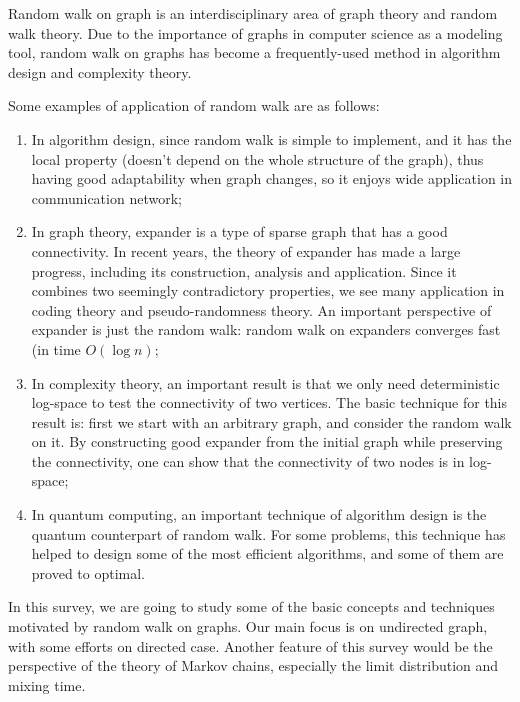 Random walk on graph is an interdisciplinary area of graph theory
and random walk theory. Due to the importance of graphs in computer
science as a modeling tool, random walk on graphs has become a
frequently-used method in algorithm design and complexity theory.

Some examples of application of random walk are as follows:

\begin{enumerate}
\item In algorithm design, since random walk is simple to implement,
and it has the local property (doesn't depend on the whole structure
of the graph), thus having good adaptability when graph changes, so
it enjoys wide application in communication network;
\item In graph theory, expander is a type of sparse graph that has a
good connectivity. In recent years, the theory of expander has made
a large progress, including its construction, analysis and
application. Since it combines two seemingly contradictory
properties, we see many application in coding theory and
pseudo-randomness theory. An important perspective of expander is
just the random walk: random walk on expanders converges fast (in
time $O(\log n)$;
\item In complexity theory, an important result is that we only need
deterministic log-space to test the connectivity of two vertices.
The basic technique for this result is: first we start with an
arbitrary graph, and consider the random walk on it. By constructing
good expander from the initial graph while preserving the
connectivity, one can show that the connectivity of two nodes is in
log-space;
\item In quantum computing, an important technique of algorithm
design is the quantum counterpart of random walk. For some problems,
this technique has helped to design some of the most efficient
algorithms, and some of them are proved to optimal.
\end{enumerate}

In this survey, we are going to study some of the basic concepts and
techniques motivated by random walk on graphs. Our main focus is on
undirected graph, with some efforts on directed case. Another
feature of this survey would be the perspective of the theory of
Markov chains, especially the limit distribution and mixing time.
